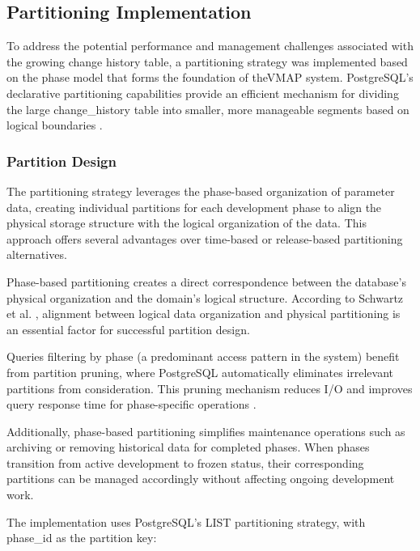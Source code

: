 \subsection{Partitioning Implementation}
\label{subsec:partitioning-implementation}

To address the potential performance and management challenges associated with the growing change history table, a partitioning strategy was implemented based on the phase model that forms the foundation of the\ac{VMAP} system. PostgreSQL's declarative partitioning capabilities provide an efficient mechanism for dividing the large change\_history table into smaller, more manageable segments based on logical boundaries \cite{obe2017postgresql}.

\subsubsection{Partition Design}
\label{subsubsec:partition-design}

The partitioning strategy leverages the phase-based organization of parameter data, creating individual partitions for each development phase to align the physical storage structure with the logical organization of the data. This approach offers several advantages over time-based or release-based partitioning alternatives.

Phase-based partitioning creates a direct correspondence between the database's physical organization and the domain's logical structure. According to Schwartz et al. \cite{schwartz2012high}, alignment between logical data organization and physical partitioning is an essential factor for successful partition design.

Queries filtering by phase (a predominant access pattern in the system) benefit from partition pruning, where PostgreSQL automatically eliminates irrelevant partitions from consideration. This pruning mechanism reduces I/O and improves query response time for phase-specific operations \cite{obe2017postgresql}.

Additionally, phase-based partitioning simplifies maintenance operations such as archiving or removing historical data for completed phases. When phases transition from active development to frozen status, their corresponding partitions can be managed accordingly without affecting ongoing development work.

The implementation uses PostgreSQL's LIST partitioning strategy, with phase\_id as the partition key:

